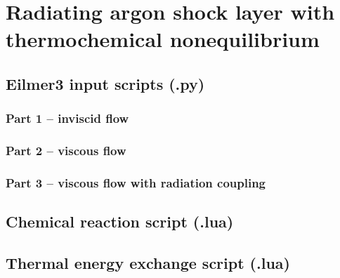 
\section{Radiating argon shock layer with thermochemical nonequilibrium}
\label{sec:}
%

\newpage

\subsection{Eilmer3 input scripts (.py)}

\subsubsection{Part 1 -- inviscid flow}

\topbar

\bottombar

\subsubsection{Part 2 -- viscous flow}

\topbar

\bottombar

\subsubsection{Part 3 -- viscous flow with radiation coupling}

\topbar

\bottombar

\subsection{Chemical reaction script (.lua)}

\topbar

\bottombar

\subsection{Thermal energy exchange script (.lua)}

